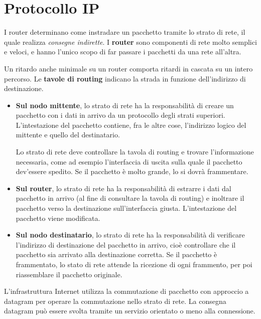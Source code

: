 \section{Protocollo IP}
    
    I router determinano come instradare un pacchetto tramite lo strato di rete, il quale realizza \textit{consegne indirette}. I \textbf{router} sono componenti di rete molto semplici e veloci, e hanno l'unico scopo di far passare i pacchetti da una rete all'altra. 
    
    Un ritardo anche minimale su un router comporta ritardi in cascata su un intero percorso. Le \textbf{tavole di routing} indicano la strada in funzione dell'indirizzo di destinazione. 
    
    
    \begin{itemize}
        \item
            \textbf{Sul nodo mittente}, lo strato di rete ha la responsabilità di creare un pacchetto con i dati in arrivo da un protocollo degli strati superiori. L'intestazione del pacchetto contiene, fra le altre cose, l'indirizzo logico del mittente e quello del destinatario. 
            
            Lo strato di rete deve controllare la tavola di routing e trovare l'informazione necessaria, come ad esempio l'interfaccia di uscita sulla quale il pacchetto dev'essere spedito. Se il pacchetto è molto grande, lo si dovrà frammentare.
            
        \item
            \textbf{Sul router}, lo strato di rete ha la responsabilità di estrarre i dati dal pacchetto in arrivo (al fine di consultare la tavola di routing) e inoltrare il pacchetto verso la destinazione sull'interfaccia giusta. L'intestazione del pacchetto viene modificata.
                
        \item
            \textbf{Sul nodo destinatario}, lo strato di rete ha la responsabilità di verificare l'indirizzo di destinazione del pacchetto in arrivo, cioè controllare che il pacchetto sia arrivato alla destinazione corretta. Se il pacchetto è frammentato, lo stato di rete attende la ricezione di ogni frammento, per poi riassemblare il pacchetto originale.
    \end{itemize}
    
    L'infrastruttura Internet utilizza la commutazione di pacchetto con approccio a datagram per operare la commutazione nello strato di rete. La consegna datagram può essere svolta tramite un servizio orientato o meno alla connessione.
    

